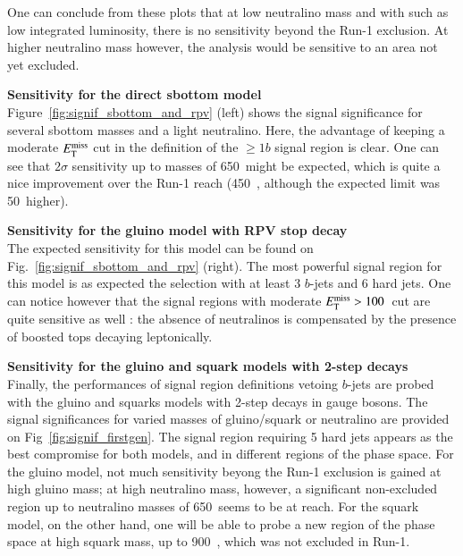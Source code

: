 One can conclude from these plots that at low neutralino mass and with such as low integrated luminosity, 
there is no sensitivity beyond the Run-1 exclusion. 
At higher neutralino mass however, the analysis would be sensitive to an area not yet excluded.  
\\
\par{\bf Sensitivity for the direct sbottom model\\}
Figure~\ref{fig:signif_sbottom_and_rpv} (left) shows the signal significance for several sbottom masses and a light neutralino. 
Here, the advantage of keeping a moderate $E_{\mathrm{T}}^{\mathrm{miss}}$ cut in the definition of the $\geq 1b$ signal region is clear. 
One can see that $2\sigma$ sensitivity up to masses of 650~\GeV might be expected, which is quite a nice improvement over the Run-1 reach 
(450~\GeV, although the expected limit was 50~\GeV higher). 
\\
\par{\bf Sensitivity for the gluino model with RPV stop decay\\}
The expected sensitivity for this model can be found on Fig.~\ref{fig:signif_sbottom_and_rpv} (right). 
The most powerful signal region for this model is as expected the selection with at least 3 $b$-jets and 6 hard jets. 
One can notice however that the signal regions with moderate $E_{\mathrm{T}}^{\mathrm{miss}}>100$~\GeV cut are quite sensitive as well : 
the absence of neutralinos is compensated by the presence of boosted tops decaying leptonically. 
\\
\par{\bf Sensitivity for the gluino and squark models with 2-step decays\\}
Finally, the performances of signal region definitions vetoing $b$-jets are probed with the gluino and squarks models with 2-step decays in gauge bosons. 
The signal significances for varied masses of gluino/squark or neutralino are provided on Fig~\ref{fig:signif_firstgen}. 
The signal region requiring 5 hard jets appears as the best compromise for both models, and in different regions of the phase space. 
For the gluino model, not much sensitivity beyong the Run-1 exclusion is gained at high gluino mass; 
at high neutralino mass, however, a significant non-excluded region up to neutralino masses of 650~\GeV seems to be at reach. 
For the squark model, on the other hand, one will be able to probe a new region of the phase space at high squark mass, up to 900~\GeV, which was not excluded in Run-1. 
